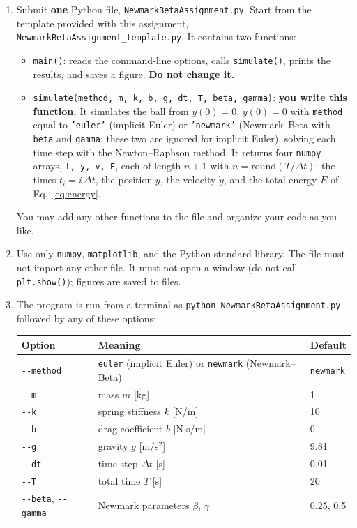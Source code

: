 \documentclass[letterpaper,11pt]{article}
\begin{document}
\begin{enumerate}
    \item Submit \textbf{one} Python file, \texttt{NewmarkBetaAssignment.py}. Start from the template provided with this assignment, \texttt{NewmarkBetaAssignment\_\allowbreak template.py}. It contains two functions:
    \begin{itemize}
        \item \texttt{main()}: reads the command-line options, calls \texttt{simulate()}, prints the results, and saves a figure. \textbf{Do not change it.}
        \item \texttt{simulate(method, m, k, b, g, dt, T, beta, gamma)}: \textbf{you write this function.} It simulates the ball from $y(0) = 0$, $\dot{y}(0) = 0$ with \texttt{method} equal to \texttt{'euler'} (implicit Euler) or \texttt{'newmark'} (Newmark--Beta with \texttt{beta} and \texttt{gamma}; these two are ignored for implicit Euler), solving each time step with the Newton--Raphson method. It returns four \texttt{numpy} arrays, \texttt{t, y, v, E}, each of length $n + 1$ with $n = \mathrm{round}(T / \Delta t)$: the times $t_i = i\,\Delta t$, the position $y$, the velocity $\dot{y}$, and the total energy $E$ of Eq.~\eqref{eq:energy}.
    \end{itemize}
    You may add any other functions to the file and organize your code as you like.
    \item Use only \texttt{numpy}, \texttt{matplotlib}, and the Python standard library. The file must not import any other file. It must not open a window (do not call \texttt{plt.show()}); figures are saved to files.
    \item The program is run from a terminal as \texttt{python NewmarkBetaAssignment.py} followed by any of these options:

    \begin{center}
    \begin{tabular}{l l l}
    \toprule
    Option & Meaning & Default \\
    \midrule
    \texttt{-{}-method} & \texttt{euler} (implicit Euler) or \texttt{newmark} (Newmark--Beta) & \texttt{newmark} \\
    \texttt{-{}-m} & mass $m$ [kg] & 1 \\
    \texttt{-{}-k} & spring stiffness $k$ [N/m] & 10 \\
    \texttt{-{}-b} & drag coefficient $b$ [N$\cdot$s/m] & 0 \\
    \texttt{-{}-g} & gravity $g$ [m/s$^2$] & 9.81 \\
    \texttt{-{}-dt} & time step $\Delta t$ [s] & 0.01 \\
    \texttt{-{}-T} & total time $T$ [s] & 20 \\
    \texttt{-{}-beta}, \texttt{-{}-gamma} & Newmark parameters $\beta$, $\gamma$ & 0.25, 0.5 \\
    \bottomrule
    \end{tabular}
    \end{center}


\end{enumerate}
\end{document}
